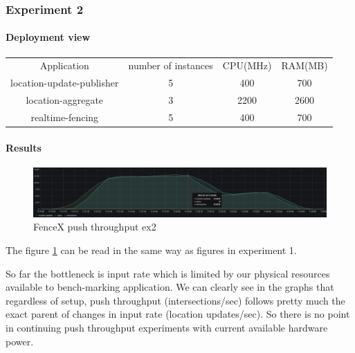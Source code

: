 \documentclass[a4]{report}
\begin{document}
    \subsubsection{Experiment 2}

    \paragraph{Deployment view}
    \begin{center}
        \begin{tabular}{ c c c c }
            Application               & number of instances & CPU(MHz) & RAM(MB) \\
            location-update-publisher & 5                   & 400      & 700     \\
            location-aggregate        & 3                   & 2200     & 2600    \\
            realtime-fencing          & 5                   & 400      & 700     \\
        \end{tabular}
    \end{center}

    \paragraph{Results}
    \begin{figure}[ht]
        \caption{FenceX push throughput ex2}
        \label{fig:ex2}
        \includegraphics[scale=0.4]{images/evaluation/ex2-benchmarking(24,10).png}
    \end{figure}
    The figure \ref{fig:ex2} can be read in the same way as figures in experiment 1.

    So far the bottleneck is input rate which is limited by our physical resources available to bench-marking
    application.
    We can clearly see in the graphs that regardless of setup, push throughput (intersections/sec) follows pretty
    much the exact parent of changes in input rate (location updates/sec).
    So there is no point in continuing push throughput experiments with current available hardware power.
\end{document}
